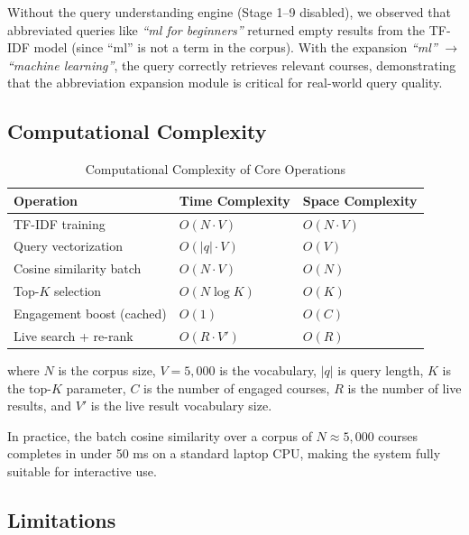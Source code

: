 \documentclass[12pt, a4paper]{article}
\begin{document}
Without the query understanding engine (Stage 1–9 disabled), we observed that abbreviated
queries like \textit{``ml for beginners''} returned empty results from the TF-IDF model (since
``ml'' is not a term in the corpus). With the expansion \textit{``ml''} $\to$ \textit{``machine
learning''}, the query correctly retrieves relevant courses, demonstrating that the abbreviation
expansion module is critical for real-world query quality.

\subsection{Computational Complexity}

\begin{table}[htbp]
\centering
\caption{Computational Complexity of Core Operations}
\label{tab:complexity}
\renewcommand{\arraystretch}{1.3}
\begin{tabular}{lll}
\toprule
\textbf{Operation} & \textbf{Time Complexity} & \textbf{Space Complexity} \\
\midrule
TF-IDF training         & $O(N \cdot V)$   & $O(N \cdot V)$ \\
Query vectorization     & $O(|q| \cdot V)$ & $O(V)$ \\
Cosine similarity batch & $O(N \cdot V)$   & $O(N)$ \\
Top-$K$ selection       & $O(N \log K)$    & $O(K)$ \\
Engagement boost (cached) & $O(1)$         & $O(C)$ \\
Live search + re-rank   & $O(R \cdot V')$  & $O(R)$ \\
\bottomrule
\end{tabular}
\end{table}

where $N$ is the corpus size, $V = 5{,}000$ is the vocabulary, $|q|$ is query length, $K$ is
the top-$K$ parameter, $C$ is the number of engaged courses, $R$ is the number of live results,
and $V'$ is the live result vocabulary size.

In practice, the batch cosine similarity over a corpus of $N \approx 5{,}000$ courses completes
in under 50 ms on a standard laptop CPU, making the system fully suitable for interactive use.

\subsection{Limitations}
\end{document}

